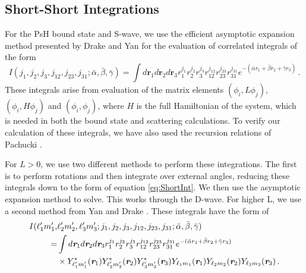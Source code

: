 \documentclass[preprint,showpacs,preprintnumbers,amsmath,amssymb]{revtex4}
\begin{document}
\subsection{Short-Short Integrations}
\label{sec:ShortInt}
For the PsH bound state and S-wave, we use the efficient asymptotic expansion method presented by Drake and Yan \cite{Drake1995} for the evaluation of correlated integrals of the form
\begin{equation}
\label{eq:ShortInt}
I(j_1,j_2,j_3,j_{12},j_{23},j_{31}; \bar{\alpha}, \bar{\beta}, \bar{\gamma}) =
\int
d \textbf{r}_1 d \textbf{r}_2 d \textbf{r}_3
r_1^{j_1} r_2^{j_2} r_3^{j_3} r_{12}^{j_{12}}
r_{23}^{j_{23}} r_{31}^{j_{31}}
e^{-(\bar{\alpha} r_1 + \bar{\beta} r_2 + \bar{\gamma} r_3)}\, .
\end{equation}
These integrals arise from evaluation of the matrix elements $(\phi_i, L \phi_j)$, $(\phi_i, H \phi_j)$ and $(\phi_i, \phi_j)$, where $H$ is the full Hamiltonian of the system,
which is needed in both the bound state and scattering calculations. To verify our calculation of these integrals, we have also used the recursion relations of Pachucki \cite{Pachucki2004}.

For $L > 0$, we use two different methods to perform these integrations. The first is to perform rotations and then integrate over external angles, reducing these integrals down to the form of equation \ref{eq:ShortInt}. We then use the asymptotic expansion method to solve. This works through the D-wave. For higher L, we use a second method from Yan and Drake \cite{Yan1997}. These integrals have the form of
\begin{align}
\label{eq:ShortIntGen}
\nonumber I(\ell_1^\prime m_1^\prime, & \ell_2^\prime m_2^\prime, \ell_3^\prime m_3^\prime; j_1,j_2,j_3,j_{12},j_{23},j_{31}; \bar{\alpha}, \bar{\beta}, \bar{\gamma}) \\
\nonumber = & \int
d \textit{\textbf{r}}_1 d \textit{\textbf{r}}_2 d \textit{\textbf{r}}_3
r_1^{j_1} r_2^{j_2} r_3^{j_3} r_{12}^{j_{12}}
r_{23}^{j_{23}} r_{31}^{j_{31}}
e^{-(\bar{\alpha} r_1 + \bar{\beta} r_2 + \bar{\gamma} r_3)} \\
& \times Y_{\ell_1^\prime m_1^\prime}^* (\textit{\textbf{r}}_1) Y_{\ell_2^\prime m_2^\prime}^* (\textit{\textbf{r}}_2) Y_{\ell_3^\prime m_3^\prime}^* (\textit{\textbf{r}}_3)
Y_{\ell_1 m_1} (\textit{\textbf{r}}_1) Y_{\ell_2 m_2} (\textit{\textbf{r}}_2) Y_{\ell_3 m_3} (\textit{\textbf{r}}_3)\, .
\end{align}
\end{document}

